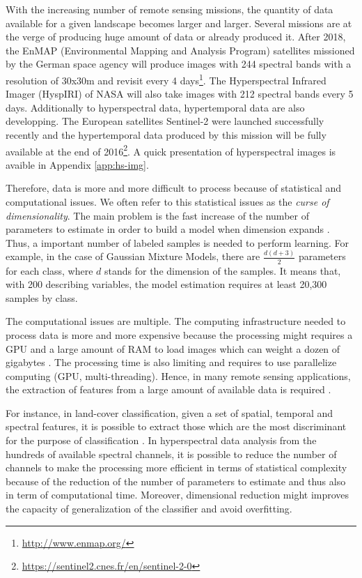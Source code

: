 \documentclass[a4paper,11pt,DIV=16,abstracton]{scrartcl}
\begin{document}
    With the increasing number of remote sensing missions, the quantity of data available for a given landscape becomes larger and larger. Several missions are at the verge of producing huge amount of data or already produced it. After 2018, the EnMAP (Environmental Mapping and Analysis Program) satellites missioned by the German space agency will produce images with 244 spectral bands with a resolution of 30x30m and revisit every 4 days\footnote{\url{http://www.enmap.org/}}. The Hyperspectral Infrared Imager (HyspIRI) of NASA will also take images with 212 spectral bands every 5 days. Additionally to hyperspectral data, hypertemporal data are also developping. The European satellites Sentinel-2 were launched successfully recently and the hypertemporal data produced by this mission will be fully available at the end of 2016\footnote{\url{https://sentinel2.cnes.fr/en/sentinel-2-0}}. A quick presentation of hyperspectral images is avaible in Appendix \ref{app:hs-img}.

    Therefore, data is more and more difficult to process because of statistical and computational issues. We often refer to this statistical issues as the \emph{curse of dimensionality}. The main problem is the fast increase of the number of parameters to estimate in order to build a model when dimension expands \cite{bouveyron2014model}. Thus, a important number of labeled samples is needed to perform learning. For example, in the case of Gaussian Mixture Models, there are $\frac{d(d+3)}{2}$ parameters for each class, where $d$ stands for the dimension of the samples. It means that, with 200 describing variables, the model estimation requires at least 20,300 samples by class.

    The computational issues are multiple. The computing infrastructure needed to process data is more and more expensive because the processing might requires a GPU and a large amount of RAM to load images which can weight a dozen of gigabytes \cite{christophe2011remote}\cite{plaza2011high}. The processing time is also limiting and requires to use parallelize computing (GPU, multi-threading). Hence, in many remote sensing applications, the extraction of features from a large amount of available data is required \cite{jimenez1998supervised}.

    For instance, in land-cover classification, given a set of spatial, temporal and spectral features, it is possible to extract those which are the most discriminant for the purpose of classification \cite{fassnacht2014comparison}. In hyperspectral data analysis from the hundreds of available spectral channels, it is possible to reduce the number of channels to make the processing more efficient in terms of statistical complexity because of the reduction of the number of parameters to estimate and thus also in term of computational time. Moreover, dimensional reduction might improves the capacity of generalization of the classifier and avoid overfitting.
\end{document}
